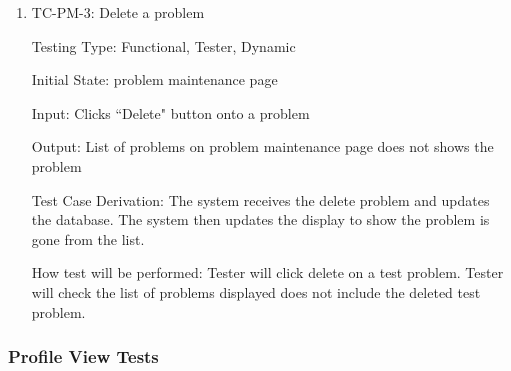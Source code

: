 \documentclass[12pt, titlepage]{article}
\begin{document}
\begin{enumerate}
\item{TC-PM-3: Delete a problem}

Testing Type: Functional, Tester, Dynamic
					
Initial State: problem maintenance page
					
Input: Clicks ``Delete" button onto a problem
					
Output: List of problems on problem maintenance page does not shows the problem

Test Case Derivation: The system receives the delete problem and updates the database. The system then updates the display to show the problem is gone from the list.
					
How test will be performed: Tester will click delete on a test problem. Tester will check the list of problems displayed does not include the deleted test problem.
\end{enumerate}

\subsubsection{Profile View Tests}

\end{document}
